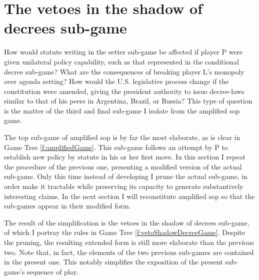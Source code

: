 \section{The vetoes in the shadow of decrees sub-game}

How would statute writing in the setter sub-game be affected if player P were given unilateral policy capability, such as that represented in the conditional decree sub-game?  What are the consequences of breaking player L's monopoly over agenda setting?  How would the U.S. legislative process change if the constitution were amended, giving the president authority to issue decree-laws similar to that of his peers in Argentina, Brazil, or Russia?  This type of question is the matter of the third and final sub-game I isolate from the amplified sop game.  

The top sub-game of amplified sop is by far the most elaborate, as is clear in Game Tree \ref{f:amplifiedGame}.  This sub-game follows an attempt by P to establish new policy by statute in his or her first move.  In this section I repeat the procedure of the previous one, presenting a modified version of the actual sub-game.  Only this time instead of developing I prune the actual sub-game, in order make it tractable while preserving its capacity to generate substantively interesting claims.  In the next section I will reconstitute amplified sop so that the sub-games appear in their modified form.  

The result of the simplification is the vetoes in the shadow of decrees sub-game, of which I portray the rules in Game Tree \ref{f:vetoShadowDecreeGame}.  Despite the pruning, the resulting extended form is still more elaborate than the previous two.  Note that, in fact, the elements of the two previous sub-games are contained in the present one.  This notably simplifies the exposition of the present sub-game's sequence of play. 


